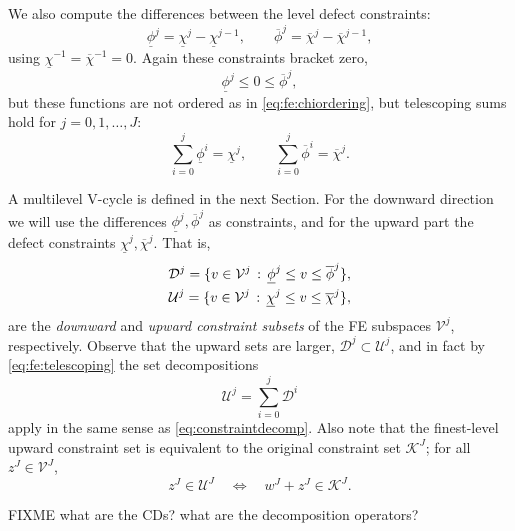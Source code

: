 \documentclass[letterpaper,final,12pt,reqno]{amsart}
\theoremstyle{cstyle}
\theoremstyle{cstyle*}
\theoremstyle{dstyle}
\numberwithin{equation}{section}
\numberwithin{figure}{section}
\numberwithin{table}{section}
\numberwithin{theorem}{section}
\begin{document}
We also compute the differences between the level defect constraints:
\begin{equation}
\underline{\phi}^j = \underline{\chi}^j - \underline{\chi}^{j-1}, \qquad \overline{\phi}^j = \overline{\chi}^j - \overline{\chi}^{j-1},  \label{eq:fe:philevels}
\end{equation}
using $\underline{\chi}^{-1}=\overline{\chi}^{-1}=0$.  Again these constraints bracket zero,
\begin{equation}
\underline{\phi}^j \le 0 \le \overline{\phi}^j,  \label{eq:fe:phibrackets}
\end{equation}
but these functions are not ordered as in \eqref{eq:fe:chiordering}, but telescoping sums hold for $j=0,1,\dots,J$:
\begin{equation}
\sum_{i=0}^j \underline{\phi}^i = \underline{\chi}^j, \qquad \sum_{i=0}^j \overline{\phi}^i = \overline{\chi}^j.  \label{eq:fe:telescoping}
\end{equation}

A multilevel V-cycle is defined in the next Section.  For the downward direction we will use the differences $\underline{\phi}^j,\overline{\phi}^j$ as constraints, and for the upward part the defect constraints $\underline{\chi}^j,\overline{\chi}^j$.  That is,
\begin{align}
\mathcal{D}^j = \{v \in \mathcal{V}^j \,:\, \underline{\phi}^j \le v \le \overline{\phi}^j\}, \label{eq:fe:constraintsets} \\
\mathcal{U}^j = \{v \in \mathcal{V}^j \,:\, \underline{\chi}^j \le v \le \overline{\chi}^j\}, \notag
\end{align}
are the \emph{downward} and \emph{upward constraint subsets} of the FE subspaces $\mathcal{V}^j$, respectively.  Observe that the upward sets are larger, $\mathcal{D}^j \subset \mathcal{U}^j$, and in fact by \eqref{eq:fe:telescoping} the set decompositions
\begin{equation}
\mathcal{U}^j = \sum_{i=0}^j \mathcal{D}^i \label{eq:fe:constraintdecomp}
\end{equation}
apply in the same sense as \eqref{eq:constraintdecomp}.  Also note that the finest-level upward constraint set is equivalent to the original constraint set $\mathcal{K}^J$; for all $z^J \in \mathcal{V}^J$,
\begin{equation}
z^J \in \mathcal{U}^J \quad \iff \quad w^J+z^J \in \mathcal{K}^J. \label{eq:fe:finestlevelequivalent}
\end{equation}

FIXME what are the CDs?  what are the decomposition operators?
\end{document}
